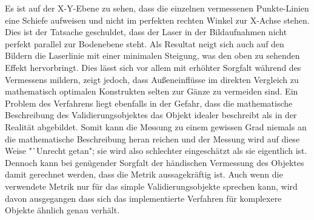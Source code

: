 Es ist auf der X-Y-Ebene zu sehen, dass die einzelnen vermessenen Punkte-Linien eine Schiefe aufweisen und nicht im perfekten rechten Winkel zur X-Achse stehen. Dies ist der Tatsache geschuldet, dass der Laser in der Bildaufnahmen nicht perfekt parallel zur Bodenebene steht. Als Resultat neigt sich auch auf den Bildern die Laserlinie mit einer minimalen Steigung, was den oben zu sehenden Effekt hervorbringt. Dies lässt sich vor allem mit erhöhter Sorgfalt während des Vermessens mildern, zeigt jedoch, dass Außeneinflüsse im direkten Vergleich zu mathematisch optimalen Konstrukten selten zur Gänze zu vermeiden sind.\linebreak
Ein Problem des Verfahrens liegt ebenfalls in der Gefahr, dass die mathematische Beschreibung des Validierungsobjektes das Objekt idealer beschreibt als in der Realität abgebildet. Somit kann die Messung zu einem gewissen Grad niemals an die mathematische Beschreibung heran reichen und der Messung wird auf diese Weise "`Unrecht getan"; sie wird also schlechter eingeschätzt als sie eigentlich ist. Dennoch kann bei genügender Sorgfalt der händischen Vermessung des Objektes damit gerechnet werden, dass die Metrik aussagekräftig ist. Auch wenn die verwendete Metrik nur für das simple Validierungsobjekte sprechen kann, wird davon ausgegangen dass sich das implementierte Verfahren für komplexere Objekte ähnlich genau verhält.